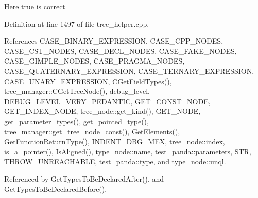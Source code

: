 Here true is correct 

Definition at line 1497 of file tree\+\_\+helper.\+cpp.



References C\+A\+S\+E\+\_\+\+B\+I\+N\+A\+R\+Y\+\_\+\+E\+X\+P\+R\+E\+S\+S\+I\+ON, C\+A\+S\+E\+\_\+\+C\+P\+P\+\_\+\+N\+O\+D\+ES, C\+A\+S\+E\+\_\+\+C\+S\+T\+\_\+\+N\+O\+D\+ES, C\+A\+S\+E\+\_\+\+D\+E\+C\+L\+\_\+\+N\+O\+D\+ES, C\+A\+S\+E\+\_\+\+F\+A\+K\+E\+\_\+\+N\+O\+D\+ES, C\+A\+S\+E\+\_\+\+G\+I\+M\+P\+L\+E\+\_\+\+N\+O\+D\+ES, C\+A\+S\+E\+\_\+\+P\+R\+A\+G\+M\+A\+\_\+\+N\+O\+D\+ES, C\+A\+S\+E\+\_\+\+Q\+U\+A\+T\+E\+R\+N\+A\+R\+Y\+\_\+\+E\+X\+P\+R\+E\+S\+S\+I\+ON, C\+A\+S\+E\+\_\+\+T\+E\+R\+N\+A\+R\+Y\+\_\+\+E\+X\+P\+R\+E\+S\+S\+I\+ON, C\+A\+S\+E\+\_\+\+U\+N\+A\+R\+Y\+\_\+\+E\+X\+P\+R\+E\+S\+S\+I\+ON, C\+Get\+Field\+Types(), tree\+\_\+manager\+::\+C\+Get\+Tree\+Node(), debug\+\_\+level, D\+E\+B\+U\+G\+\_\+\+L\+E\+V\+E\+L\+\_\+\+V\+E\+R\+Y\+\_\+\+P\+E\+D\+A\+N\+T\+IC, G\+E\+T\+\_\+\+C\+O\+N\+S\+T\+\_\+\+N\+O\+DE, G\+E\+T\+\_\+\+I\+N\+D\+E\+X\+\_\+\+N\+O\+DE, tree\+\_\+node\+::get\+\_\+kind(), G\+E\+T\+\_\+\+N\+O\+DE, get\+\_\+parameter\+\_\+types(), get\+\_\+pointed\+\_\+type(), tree\+\_\+manager\+::get\+\_\+tree\+\_\+node\+\_\+const(), Get\+Elements(), Get\+Function\+Return\+Type(), I\+N\+D\+E\+N\+T\+\_\+\+D\+B\+G\+\_\+\+M\+EX, tree\+\_\+node\+::index, is\+\_\+a\+\_\+pointer(), Is\+Aligned(), type\+\_\+node\+::name, test\+\_\+panda\+::parameters, S\+TR, T\+H\+R\+O\+W\+\_\+\+U\+N\+R\+E\+A\+C\+H\+A\+B\+LE, test\+\_\+panda\+::type, and type\+\_\+node\+::unql.



Referenced by Get\+Types\+To\+Be\+Declared\+After(), and Get\+Types\+To\+Be\+Declared\+Before().

